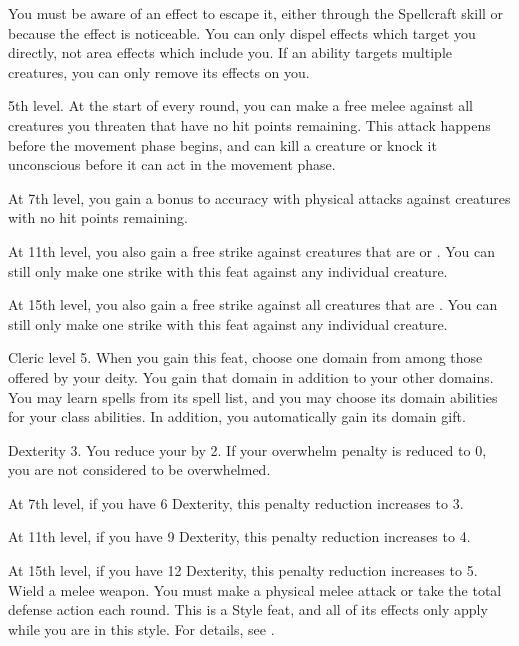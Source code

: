     You must be aware of an effect to escape it, either through the Spellcraft skill or because the effect is noticeable.
    You can only dispel effects which target you directly, not area effects which include you.
    If an ability targets multiple creatures, you can only remove its effects on you.

    \featpres 5th level.
    \featben At the start of every round, you can make a free melee  against all creatures you threaten that have no hit points remaining.
    This attack happens before the movement phase begins, and can kill a creature or knock it unconscious before it can act in the movement phase.

    At 7th level, you gain a  bonus to accuracy with physical attacks against creatures with no hit points remaining.

    At 11th level, you also gain a free strike against creatures that are \helpless or \unaware.
    You can still only make one strike with this feat against any individual creature.

    At 15th level, you also gain a free strike against all creatures that are \bloodied.
    You can still only make one strike with this feat against any individual creature.

    \featpre Cleric level 5.
    \featben When you gain this feat, choose one domain from among those offered by your deity.
    You gain that domain in addition to your other domains.
    You may learn spells from its spell list, and you may choose its domain abilities for your class abilities.
    In addition, you automatically gain its domain gift.

    \featpres Dexterity 3.
    \featben You reduce your  by 2.
    If your overwhelm penalty is reduced to 0, you are not considered to be overwhelmed.

    At 7th level, if you have 6 Dexterity, this penalty reduction increases to 3.

    At 11th level, if you have 9 Dexterity, this penalty reduction increases to 4.

    At 15th level, if you have 12 Dexterity, this penalty reduction increases to 5.
    \stylereq Wield a melee weapon. You must make a physical melee attack or take the total defense action each round.
     This is a Style feat, and all of its effects only apply while you are in this style.
    For details, see .

